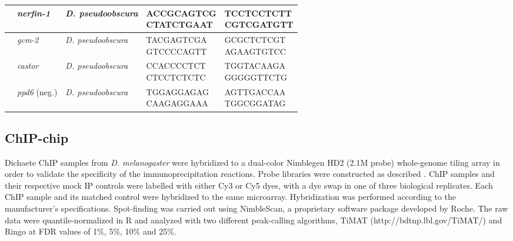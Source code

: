 \begin{center}
\begin{longtable}{|l|l|p{2.2cm}|p{3.3cm}|p{3.2cm}|}
         & \emph{nerfin-1}       & \emph{D. pseudoobscura} & \parbox[t]{3cm}{ACCGCAGTCG\\ CTATCTGAAT} & \parbox[t]{3cm}{TCCTCCTCTT\\ CGTCGATGTT} \\ \hline
         & \emph{gcm-2}         & \emph{D. pseudoobscura}  & \parbox[t]{3cm}{TACGAGTCGA\\ GTCCCCAGTT} & \parbox[t]{3cm}{GCGCTCTCGT\\ AGAAGTGTCC} \\ \hline
         & \emph{castor}         & \emph{D. pseudoobscura} & \parbox[t]{3cm}{CCACCCCTCT\\ CTCCTCTCTC} & \parbox[t]{3cm}{TGGTACAAGA\\ GGGGGTTCTG} \\ \hline
         & \emph{ppd6} (neg.)    & \emph{D. pseudoobscura} & \parbox[t]{3cm}{TGGAGGAGAG\\ CAAGAGGAAA} & \parbox[t]{3cm}{AGTTGACCAA\\ TGGCGGATAG} \\ \hline
\end{longtable}

\label{Table 2.1}
\end{center}

\subsection{ChIP-chip}
Dichaete ChIP samples from \emph{D. melanogaster} were hybridized to a dual-color Nimblegen HD2 (2.1M probe) whole-genome tiling array in order to validate the specificity of the immunoprecipitation reactions. Probe libraries were constructed as described \citep{sandmann_chip--chip_2007}. ChIP samples and their respective mock IP controls were labelled with either Cy3 or Cy5 dyes, with a dye swap in one of three biological replicates. Each ChIP sample and its matched control were hybridized to the same microarray. Hybridization was performed according to the manufacturer’s specifications. Spot-finding was carried out using NimbleScan, a proprietary software package developed by Roche. The raw data were quantile-normalized in R and analyzed with two different peak-calling algorithms, TiMAT (http://bdtnp.lbl.gov/TiMAT/) and Ringo \citep{toedling_ringo_2007} at FDR values of 1\%, 5\%, 10\% and 25\%.

